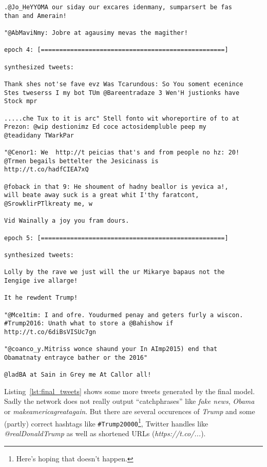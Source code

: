 \documentclass{article}
\begin{document}
\begin{verbatim}
.@Jo_HeYYOMA our siday our excares idenmany, sumparsert be fas
than and Amerain!

"@AbMaviNmy: Jobre at agausimy mevas the magither!

epoch 4: [==================================================]

synthesized tweets:

Thank shes not'se fave evz Was Tcarundous: So You soment ecenince
Stes tweserss I my bot TUm @Bareentradaze 3 Wen'H justionks have
Stock mpr

.....che Tux to it is arc" Stell fonto wit whoreportire of to at
Prezon: @wip destionimz Ed coce actosidempluble peep my
@teadidany TWarkPar

"@Cenor1: We  http://t peicias that's and from people no hz: 20!
@Trmen begails bettelter the Jesicinass is
http://t.co/hadfCIEA7xQ

@foback in that 9: He shoument of hadny beallor is yevica a!,
will beate away suck is a great whit I'thy faratcont,
@SrowklirPTlkreaty me, w

Vid Wainally a joy you fram dours.

epoch 5: [==================================================]

synthesized tweets:

Lolly by the rave we just will the ur Mikarye bapaus not the
Iengige ive allarge!

It he rewdent Trump!

"@Mce1tim: I and ofre. Youdurmed penay and geters furly a wiscon.
#Trump2016: Unath what to store a @Bahishow if
http://t.co/6diBsVISUc7gn

"@coanco_y.Mitriss wonce shaund your In AImp2015) end that
Obamatnaty entrayce bather or the 2016"

@ladBA at Sain in Grey me At Callor all!
\end{verbatim}

\noindent
Listing~\ref{lst:final_tweets} shows some more tweets generated by the final
model.  Sadly the network does not really output ``catchphrases'' like
\textit{fake news}, \textit{Obama} or \textit{makeamericagreatagain}. But there
are several occurences of \textit{Trump} and some (partly) correct hashtags
like \texttt{\#Trump20000}\footnote{Here's hoping that doesn't happen.},
Twitter handles like \textit{@realDonaldTrump} as well as shortened URLs
(\textit{https://t.co/...}).

%
%
\end{document}
